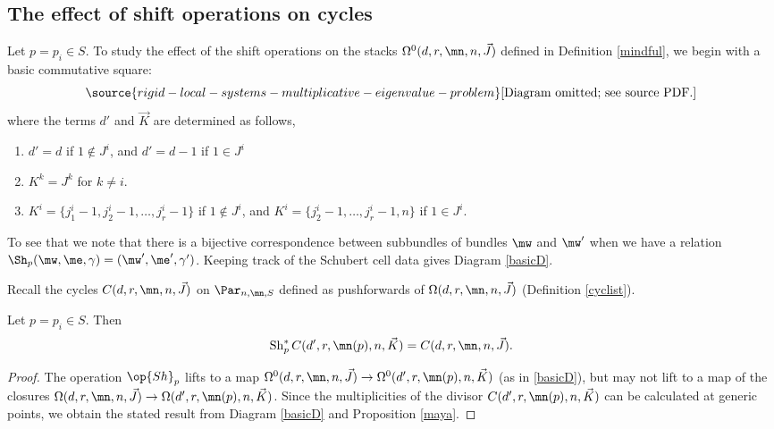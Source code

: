 \subsection{The effect of shift operations on cycles}
Let $p=p_i\in S$. To study the effect of the shift operations on the stacks $\Omega^0(d,r,\mn,n,\vec{J})$ defined in Definition  \ref{mindful}, we begin with a basic commutative square:
\begin{equation}\label{basicD}
\source{rigid-local-systems-multiplicative-eigenvalue-problem}
\text{[Diagram omitted; see source PDF.]}
\end{equation}
where the terms $d'$ and $\vec{K}$ are determined as follows,
 \begin{enumerate}
 \item $d'=d$ if $1\notin J^i$, and $d'=d-1$ if $1\in J^i$
 \item $K^k=J^k$ for $k\neq i$.
 \item $K^i =\{j^i_1-1,j^i_2-1,\dots, j^i_r-1\}$ if $1\notin J^i$, and $K^i =\{j^i_2-1,\dots, j^i_r-1,n\}$ if $1\in J^i$.
 \end{enumerate}

To see that we note that there is a bijective correspondence between subbundles of bundles $\mw$ and $\mw'$ when we have a relation $\Sh_p(\mw,\me,\gamma)=(\mw',\me',\gamma')$. Keeping track of the Schubert cell data gives Diagram \eqref{basicD}.

Recall the cycles $C(d,r,\mn,n,\vec{J})$ on $\Par_{n,\mn,S}$ defined as pushforwards of $\Omega(d,r,\mn,n,\vec{J})$ (Definition  \ref{cyclist}).
 \begin{lemma}
\notready\label{newS} Let $p=p_i\in S$. Then
 $$\operatorname{Sh}_{p}^*C(d',r,\mn(p),n,\vec{K})=C(d,r,\mn,n,\vec{J}).$$
 \end{lemma}
\begin{proof}
 The operation $\op{Sh}_p$  lifts to a map  $\Omega^0(d,r,\mn,n,\vec{J})\to \Omega^0(d',r,\mn(p),n,\vec{K})$ (as in \eqref{basicD}), but  may not lift to a map of the closures $\Omega(d,r,\mn,n,\vec{J})\to \Omega(d',r,\mn(p),n,\vec{K})$. Since the multiplicities of the divisor
$C(d',r,\mn(p),n,\vec{K})$ can be calculated at generic points, we obtain the stated result from Diagram \eqref{basicD} and Proposition \ref{maya}.
\end{proof}
